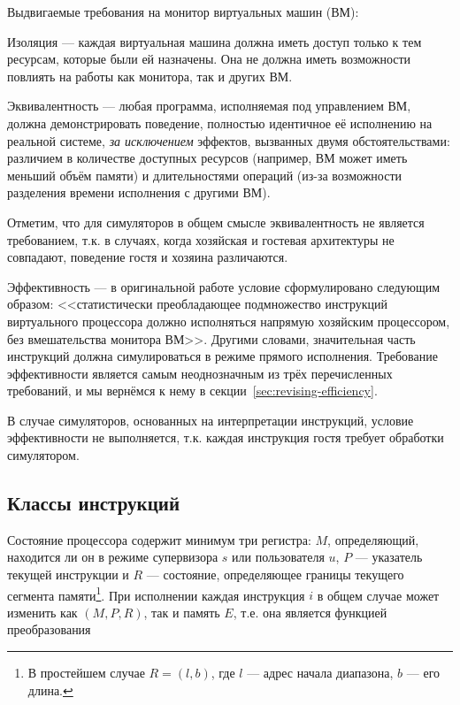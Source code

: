 Выдвигаемые требования на монитор виртуальных машин (ВМ): 

\begin{description*}

\item[Изоляция] --- каждая виртуальная машина должна иметь доступ только к тем ресурсам, которые были ей назначены. Она не должна иметь возможности повлиять на работы как монитора, так и других ВМ.

\item[Эквивалентность] --- любая программа, исполняемая под управлением ВМ, должна демонстрировать поведение, полностью идентичное её исполнению на реальной системе, \emph{за исключением} эффектов, вызванных двумя обстоятельствами: различием в количестве доступных ресурсов (например, ВМ может иметь меньший объём памяти) и длительностями операций (из-за возможности разделения времени исполнения с другими ВМ).

Отметим, что для симуляторов в общем смысле эквивалентность не является требованием, т.к. в случаях, когда хозяйская и гостевая архитектуры не совпадают, поведение гостя и хозяина различаются.

\item[Эффективность] --- в оригинальной работе условие сформулировано следующим образом: <<статистически преобладающее подмножество инструкций виртуального процессора должно исполняться напрямую хозяйским процессором, без вмешательства монитора ВМ>>. Другими словами, значительная часть инструкций должна симулироваться в режиме прямого исполнения. Требование эффективности является самым неоднозначным из трёх перечисленных требований, и мы вернёмся к нему в секции~\ref{sec:revising-efficiency}.

В случае симуляторов, основанных на интерпретации инструкций, условие эффективности не выполняется, т.к. каждая инструкция гостя требует обработки симулятором.

\end{description*}

\subsection{Классы инструкций}

Состояние процессора содержит минимум три регистра: $M$, определяющий, находится ли он в режиме супервизора $s$ или пользователя $u$, $P$ --- указатель текущей инструкции и $R$ --- состояние, определяющее границы текущего сегмента памяти\footnote{В простейшем случае $R=(l,b)$, где $l$ --- адрес начала диапазона, $b$ --- его длина.}. При исполнении каждая инструкция $i$ в общем случае может изменить как $(M,P,R)$, так и память $E$, т.е. она является функцией преобразования 

